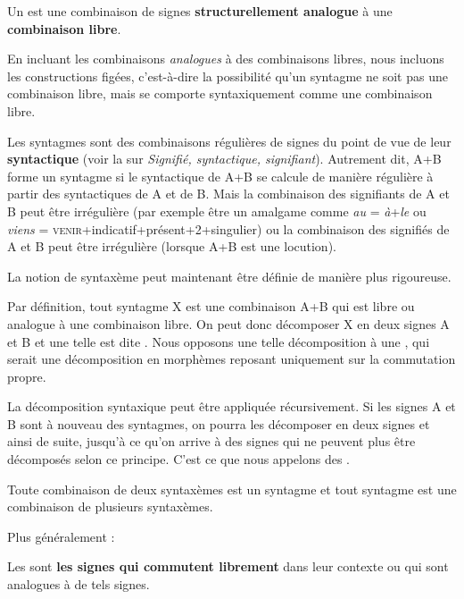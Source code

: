 \begin{styleLivreImportant}
Un  est une combinaison de signes \textbf{structurellement analogue} à une \textbf{combinaison libre}.
\end{styleLivreImportant}

En incluant les combinaisons \textit{analogues} à des combinaisons libres, nous incluons les constructions figées, c’est-à-dire la possibilité qu’un syntagme ne soit pas une combinaison libre, mais se comporte syntaxiquement comme une combinaison libre.

Les syntagmes sont des combinaisons régulières de signes du point de vue de leur \textbf{syntactique} (voir la  sur \textit{Signifié, syntactique, signifiant}). Autrement dit, A+B forme un syntagme si le syntactique de A+B se calcule de manière régulière à partir des syntactiques de A et de B. Mais la combinaison des signifiants de A et B peut être irrégulière (par exemple être un amalgame comme \textit{au} = \textit{à}+\textit{le} ou \textit{viens} = \textsc{venir}+indicatif+présent+2+singulier) ou la combinaison des signifiés de A et B peut être irrégulière (lorsque A+B est une locution).

La notion de syntaxème peut maintenant être définie de manière plus rigoureuse.

Par définition, tout syntagme X est une combinaison A+B qui est libre ou analogue à une combinaison libre. On peut donc décomposer X en deux signes A et B et une telle  est dite . Nous opposons une telle décomposition à une , qui serait une décomposition en morphèmes reposant uniquement sur la commutation propre.

La décomposition syntaxique peut être appliquée récursivement. Si les signes A et B sont à nouveau des syntagmes, on pourra les décomposer en deux signes et ainsi de suite, jusqu’à ce qu’on arrive à des signes qui ne peuvent plus être décomposés selon ce principe. C’est ce que nous appelons des .

Toute combinaison de deux syntaxèmes est un syntagme et tout syntagme est une combinaison de plusieurs syntaxèmes.

Plus généralement :

\begin{styleLivreImportant}
Les  sont \textbf{les signes qui commutent librement} dans leur contexte ou qui sont analogues à de tels signes.
\end{styleLivreImportant}

